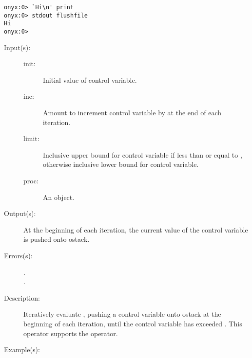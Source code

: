 \begin{description}
\begin{description}
\begin{verbatim}
onyx:0> `Hi\n' print
onyx:0> stdout flushfile
Hi
onyx:0>
		\end{verbatim}
	\end{description}
\label{systemdict:for}
\item[{\onyxop{init inc limit proc}{for}{--}}: ]
	\begin{description}\item[]
	\item[Input(s): ]
		\begin{description}\item[]
		\item[init: ]
			Initial value of control variable.
		\item[inc: ]
			Amount to increment control variable by at the end of
			each iteration.
		\item[limit: ]
			Inclusive upper bound for control variable if less than
			or equal to , otherwise inclusive lower
			bound for control variable.
		\item[proc: ]
			An object.
		\end{description}
	\item[Output(s): ]  At the beginning of each iteration, the current
		value of the control variable is pushed onto ostack.
	\item[Errors(s): ]
		\begin{description}\item[]
		\item[.]
		\item[.]
		\end{description}
	\item[Description: ]
		Iteratively evaluate , pushing a control variable
		onto ostack at the beginning of each iteration, until the
		control variable has exceeded .  This operator
		supports the 
		operator.
	\item[Example(s): ]\begin{verbatim}


\end{verbatim}
\end{description}
\end{description}
